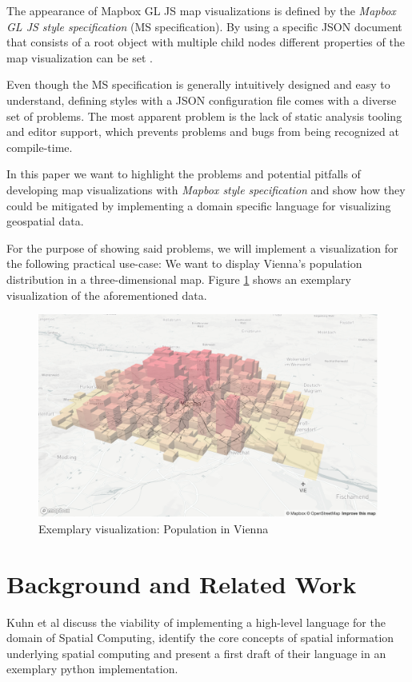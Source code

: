 \documentclass[conference]{IEEEtran}
\begin{document}
The appearance of  Mapbox GL JS map visualizations is defined by the \textit{Mapbox GL JS style specification} (MS specification). By using a specific JSON document that consists of a root object with multiple child nodes different properties of the map visualization can be set \cite{mapbox2020style}.

Even though the MS specification is generally intuitively designed and easy to understand, defining styles with a JSON configuration file comes with a diverse set of problems. 
The most apparent problem is the lack of static analysis tooling and editor support, which prevents problems and bugs from being recognized at compile-time. 

In this paper we want to highlight the problems and potential pitfalls of developing map visualizations with \textit{Mapbox style specification} and show how they could be mitigated by implementing a domain specific language for visualizing geospatial data. 

For the purpose of showing said problems, we will implement a visualization for the following practical use-case: We want to display Vienna's population distribution in a three-dimensional map. Figure \ref{fig:map_viz} shows an exemplary visualization of the aforementioned data. 

\begin{figure}
    \centering
    \includegraphics[width=\columnwidth]{img/population_vienna.png}
    \caption{Exemplary visualization: Population in Vienna}
    \label{fig:map_viz}
\end{figure}

\section{Background and Related Work}
Kuhn et al \cite{kuhn2015designing} discuss the viability of implementing a high-level language for the domain of Spatial Computing, identify the core concepts of spatial information underlying spatial computing and present a first draft of their language in an exemplary python implementation.
\end{document}
